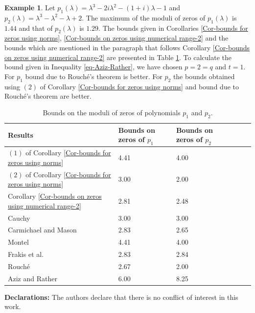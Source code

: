 \documentclass[12pt, reqno]{amsart}
\theoremstyle{definition}
\newtheorem{example}[theorem]{Example}
\theoremstyle{remark}
\numberwithin{equation}{section}
\begin{document}
\begin{example}\label{ex-polynomial-1}
Let $p_1(\lambda) = \lambda^3- 2i \lambda^2 - (1+i)\lambda-1$ and 
$p_2(\lambda) = \lambda^3 - \lambda^2 - \lambda+2$. The maximum of the moduli of 
zeros of $p_1(\lambda)$ is $1.44$ and that of $p_2(\lambda)$ is $1.29$. The bounds 
given in Corollaries \ref{Cor-bounds for zeros using norms}, 
\ref{Cor-bounds on zeros using numerical range-2} and the bounds which are mentioned 
in the paragraph that follows Corollary \ref{Cor-bounds on zeros using numerical range-2}
are presented in Table \ref{table:4}. To calculate the bound given in Inequality \eqref{eq-Aziz-Rather}, 
we have chosen $p=2=q$ and $t=1$. For $p_1$ bound due to Rouch\'e's theorem is better. 
For $p_2$ the bounds obtained using $(2)$ of Corollary \ref{Cor-bounds for zeros using norms} 
and bound due to Rouch\'e's theorem are better.  

\begin{table}[h!]
\centering
\begin{tabular}{l l l l l l}
\hline
Results & Bounds on zeros of $p_1$ & Bounds on zeros of $p_2$ \\ [0.5ex] 
\hline

$(1)$ of Corollary \ref{Cor-bounds for zeros using norms} & 4.41 & 4.00\\
$(2)$ of Corollary \ref{Cor-bounds for zeros using norms} & 3.00 & 2.00\\
Corollary \ref{Cor-bounds on zeros using numerical range-2} & 2.81 & 2.48\\
Cauchy \cite{Horn-Johnson} & 3.00 & 3.00\\
Carmichael and Mason \cite{Horn-Johnson} & 2.83 & 2.65\\
Montel \cite{Horn-Johnson} & 4.41 & 4.00\\
Frakis et al. \cite{Abdelkader-Faud-Soumia} & 2.83 & 2.84\\
Rouch\'e \cite{Cauchy} & 2.67 & 2.00\\
Aziz and Rather \cite{Aziz-Rather} & 6.00 & 8.25\\[1ex] 
\hline
\end{tabular}
\vspace{0.2cm}
\caption{Bounds on the moduli of zeros of polynomials $p_1$ and $p_2$.}
\label{table:4}
\end{table}   
\end{example} 


\medskip
\noindent
{\bf Declarations:} The authors declare that there is no conflict of interest in 
this work. 
\end{document}
